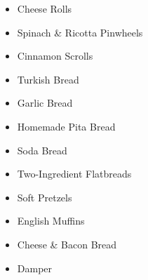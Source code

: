 \begin{itemize}
  \item \todo Cheese Rolls 
  \item \todo Spinach \& Ricotta Pinwheels
  \item \todo Cinnamon Scrolls
  \item \todo Turkish Bread
  \item \todo Garlic Bread
  \item \todo Homemade Pita Bread
  \item \todo Soda Bread
  \item \todo Two-Ingredient Flatbreads 
  \item \todo Soft Pretzels
  \item \todo English Muffins
  \item \todo Cheese \& Bacon Bread
  \item \todo Damper
\end{itemize}
